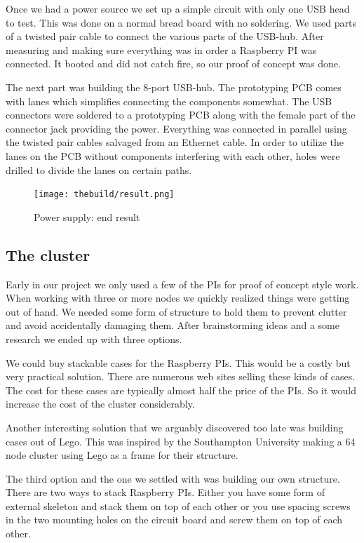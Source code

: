 Once we had a power source we set up a simple circuit with only one USB head to test. This was done on a normal bread board with no soldering. We used parts of a twisted pair cable to connect the various parts of the USB-hub. After measuring and making sure everything was in order a Raspberry PI was connected. It booted and did not catch fire, so our proof of concept was done. 

The next part was building the 8-port USB-hub. The prototyping PCB comes with lanes which simplifies connecting the components somewhat. The USB connectors were soldered to a prototyping PCB along with the female part of the connector jack providing the power. Everything was connected in parallel using the twisted pair cables salvaged from an Ethernet cable. In order to utilize the lanes on the PCB without components interfering with each other, holes were drilled to divide the lanes on certain paths.   

\begin{figure}[h]
	\centering
    \texttt{[image: thebuild/result.png]}
    \caption{Power supply: end result}
    \label{fig:build_power_supply}
\end{figure}

\subsection{The cluster}
Early in our project we only used a few of the PIs for proof of concept style work. When working with three or more nodes we quickly realized things were getting out of hand. We needed some form of structure to hold them to prevent clutter and avoid accidentally damaging them. After brainstorming ideas and a some research we ended up with three options. 

We could buy stackable cases for the Raspberry PIs. This would be a costly but very practical solution. There are numerous web sites selling these kinds of cases. The cost for these cases are typically almost half the price of the PIs. So it would increase the cost of the cluster considerably.

Another interesting solution that we arguably discovered too late was building cases out of Lego. This was inspired by the Southampton University making a 64 node cluster using Lego as a frame for their structure.\cite{legos} 

The third option and the one we settled with was building our own structure. There are two ways to stack Raspberry PIs. Either you have some form of external skeleton and stack them on top of each other or you use spacing screws in the two mounting holes on the circuit board and screw them on top of each other. 

